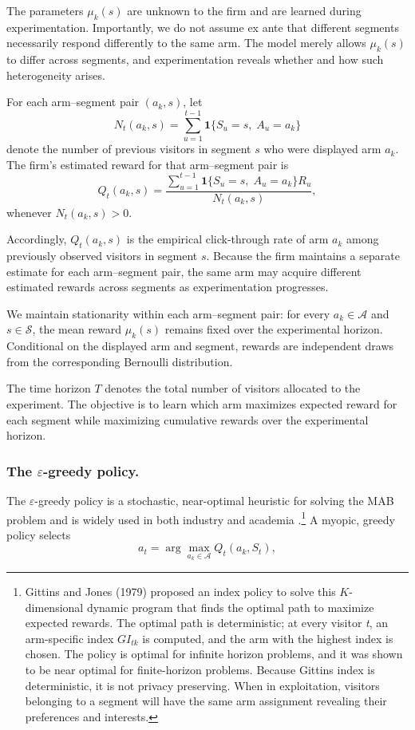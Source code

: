 \documentclass[mksc,nonblindrev]{informs3}
\begin{document}
The parameters \(\mu_k(s)\) are unknown to the firm and are learned during experimentation. Importantly, we do not assume ex ante that different segments necessarily respond differently to the same arm. The model merely allows \(\mu_k(s)\) to differ across segments, and experimentation reveals whether and how such heterogeneity arises.

For each arm--segment pair \((a_k,s)\), let
\[
N_t(a_k,s)
=
\sum_{u=1}^{t-1}
\mathbf{1}\{S_u=s,\;A_u=a_k\}
\]
denote the number of previous visitors in segment \(s\) who were displayed arm \(a_k\). The firm's estimated reward for that arm--segment pair is
\begin{equation}
\label{eq:segment-Q}
Q_t(a_k,s)
=
\frac{
\sum_{u=1}^{t-1}
\mathbf{1}\{S_u=s,\;A_u=a_k\}R_u
}{
N_t(a_k,s)
},
\end{equation}
whenever \(N_t(a_k,s)>0\).

Accordingly, \(Q_t(a_k,s)\) is the empirical click-through rate of arm \(a_k\) among previously observed visitors in segment \(s\). Because the firm maintains a separate estimate for each arm--segment pair, the same arm may acquire different estimated rewards across segments as experimentation progresses.

We maintain stationarity within each arm--segment pair: for every \(a_k\in\mathcal A\) and \(s\in\mathcal S\), the mean reward \(\mu_k(s)\) remains fixed over the experimental horizon. Conditional on the displayed arm and segment, rewards are independent draws from the corresponding Bernoulli distribution.

The time horizon \(T\) denotes the total number of visitors allocated to the experiment. The objective is to learn which arm maximizes expected reward for each segment while maximizing cumulative rewards over the experimental horizon.
\subsubsection{The $\varepsilon$-greedy policy.}
The $\varepsilon$-greedy policy is a stochastic, near-optimal heuristic for solving the MAB problem and is widely used in both industry and academia \citep[e.g.,][]{Wang_2025, OptimizelyMultiArmedBanditGlossary}.\footnote{Gittins and Jones (1979) proposed an index policy to solve this $K$-dimensional dynamic program that finds the optimal path to maximize expected rewards. The optimal path is deterministic; at every visitor \textit{t}, an arm-specific index $GI_{tk}$ is computed, and the arm with the highest index is chosen. The policy is optimal for infinite horizon problems, and it was shown to be near optimal for finite-horizon problems. Because Gittins index is deterministic, it is not privacy preserving. When in exploitation, visitors belonging to a segment will have the same arm assignment revealing their preferences and interests.}
A myopic, greedy policy selects
\begin{equation}
\label{eq:greedya_t}
a_t
=
\arg\max_{a_k\in\mathcal A}
Q_t(a_k,S_t),
\end{equation}
\end{document}
